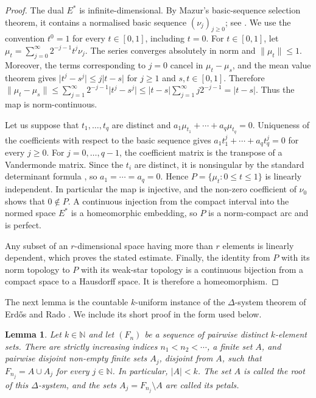 \documentclass[a4paper]{amsart}
\newtheorem{lemma}[theorem]{Lemma}
\newcommand{\N}{\mathbb{N}}
\newcommand{\abs}[1]{\lvert #1\rvert}
\newcommand{\norm}[1]{\lVert #1\rVert}
\begin{document}
\begin{proof}
The dual $E^*$ is infinite-dimensional.  By Mazur's basic-sequence
selection theorem, it contains a normalised basic sequence
$(\nu_j)_{j\geqslant0}$; see
\cite[Section~1.5]{AlbiacKalton2016}.  We use the convention $t^0=1$
for every $t\in[0,1]$, including $t=0$.  For $t\in[0,1]$, let
$\mu_t=\sum_{j=0}^{\infty}2^{-j-1}t^j\nu_j$.
The series converges absolutely in norm and $\norm{\mu_t}\leqslant1$.
Moreover, the terms corresponding to $j=0$ cancel in
$\mu_t-\mu_s$, and the mean value theorem gives
$\abs{t^j-s^j}\leqslant j\abs{t-s}$ for $j\geqslant1$ and
$s,t\in[0,1]$.  Therefore
$\norm{\mu_t-\mu_s}\leqslant
\sum_{j=1}^{\infty}2^{-j-1}\abs{t^j-s^j}\leqslant
\abs{t-s}\sum_{j=1}^{\infty}j2^{-j-1}=\abs{t-s}$.  Thus the map is
norm-continuous.

Let us suppose that $t_1,\ldots,t_q$ are distinct and
$a_1\mu_{t_1}+\cdots+a_q\mu_{t_q}=0$.
Uniqueness of the coefficients with respect to the basic sequence gives
$a_1t_1^j+\cdots+a_qt_q^j=0$ for every $j\geqslant0$.  For
$j=0,\ldots,q-1$, the coefficient matrix is the transpose of a
Vandermonde matrix.  Since the $t_i$ are distinct, it is nonsingular by
the standard determinant formula
\cite[Section~VM, Theorem~DVM]{Beezer2004}, so
$a_1=\cdots=a_q=0$.  Hence $P=\{\mu_t:0\leqslant t\leqslant1\}$ is
linearly independent.  In particular the map is injective, and
the non-zero coefficient of $\nu_0$ shows that $0\notin P$.  A continuous
injection from the compact interval into the normed space $E^*$ is a
homeomorphic embedding, so $P$ is a norm-compact arc and is perfect.

Any subset of an $r$-dimensional space having more than $r$ elements is
linearly dependent, which proves the stated estimate.  Finally,
the identity from $P$ with its norm topology to $P$ with its weak-star
topology is a continuous bijection from a compact space to a Hausdorff
space.  It is therefore a homeomorphism.
\end{proof}

The next lemma is the countable $k$-uniform instance of the
$\Delta$-system theorem of Erd\H{o}s and Rado
\cite[p.~86]{ErdosRado1960}.  We include its short proof in the form
used below.

\begin{lemma}\label{lem:delta-system}
Let $k\in\N$ and let $(F_n)$ be a sequence of pairwise distinct
$k$-element sets.  There are strictly increasing indices
$n_1<n_2<\cdots$, a finite set $A$, and pairwise disjoint non-empty
finite sets $A_j$, disjoint from $A$, such that
$F_{n_j}=A\cup A_j$ for every $j\in\N$.  In particular, $\abs A<k$.
The set $A$ is called the root of this $\Delta$-system, and the sets
$A_j=F_{n_j}\setminus A$ are called its petals.
\end{lemma}
\end{document}
